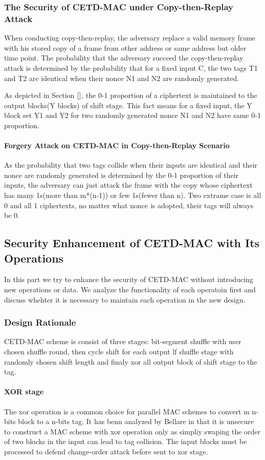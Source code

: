\documentclass{article}
\begin{document}
\subsubsection{The Security of CETD-MAC under Copy-then-Replay Attack}
When conducting copy-then-replay, the adversary replace a valid memory frame with his stored copy of a frame from other address or same address but older time point. The probability that the adversary succeed the copy-then-replay attack is determined by the probability that for a fixed input C, the two tags T1 and T2 are identical when their nonce N1 and N2 are randomly generated.

As depicted in Section $\ref{}$, the 0-1 proportion of a ciphertext is maintained to the output blocks(Y blocks) of shift stage. This fact means for a fixed input, the Y block set Y1 and Y2 for two randomly generated nonce N1 and N2 have same 0-1 proportion.  
\paragraph{Forgery Attack on CETD-MAC in Copy-then-Replay Scenario}
As the probability that two tags collide when their inputs are identical and their nonce are randomly generated is determined by the 0-1 proportion of their inputs, the adversary can just attack the frame with the copy whose ciphertext has many 1s(more than m*(n-1)) or few 1s(fewer than n). Two extrame case is all 0 and all 1 ciphertexts, no matter what nonce is adopted, their tags will always be 0.

\subsection{Security Enhancement of CETD-MAC with Its Operations}
In this part we try to enhance the security of CETD-MAC without introducing new operations or data. We analyze the functionality of each operatoin first and discuss whehter it is necessary to maintain each operation in the new design.
\subsubsection{Design Rationale}
CETD-MAC scheme is consist of three stages: bit-segment shuffle with user chosen shuffle round, then cycle shift for each output lf shuffle stage with randomly chosen shift length and finaly xor all output block of shift stage to the tag.
\paragraph{XOR stage}
The xor operation is a common choice for parallel MAC schemes to convert m n-bits block to a n-bits tag. It has benn analyzed by Bellare in \cite{} that it is unsecure to construct a MAC scheme with xor operation only as simpliy swaping the order of two blocks in the input can lead to tag collision.  The input blocks must be processed to defend change-order attack before sent to xor stage.
\end{document}
